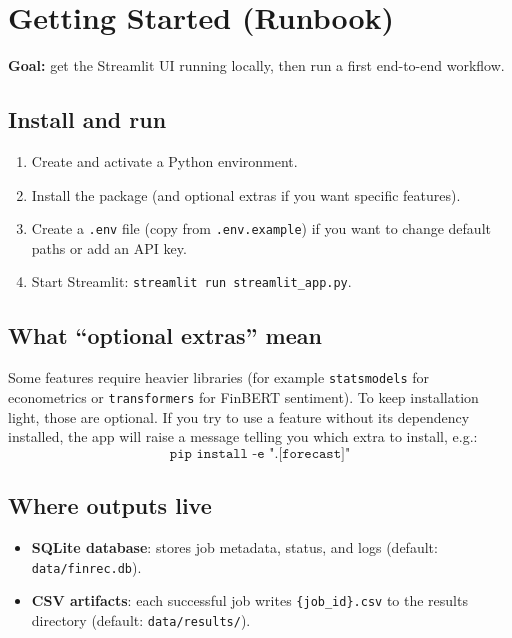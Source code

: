 \documentclass[11pt,a4paper]{article}
\begin{document}
\section{Getting Started (Runbook)}

\textbf{Goal:} get the Streamlit UI running locally, then run a first end-to-end workflow.

\subsection{Install and run}
\begin{enumerate}[leftmargin=2.2em]
  \item Create and activate a Python environment.
  \item Install the package (and optional extras if you want specific features).
  \item Create a \texttt{.env} file (copy from \texttt{.env.example}) if you want to change default paths or add an API key.
  \item Start Streamlit: \texttt{streamlit run streamlit\_app.py}.
\end{enumerate}

\subsection{What ``optional extras'' mean}
Some features require heavier libraries (for example \texttt{statsmodels} for econometrics or \texttt{transformers} for FinBERT sentiment). To keep installation light, those are optional. If you try to use a feature without its dependency installed, the app will raise a message telling you which extra to install, e.g.:
\[
\texttt{pip install -e ".[forecast]"}
\]

\subsection{Where outputs live}
\begin{itemize}[leftmargin=2em]
  \item \textbf{SQLite database}: stores job metadata, status, and logs (default: \texttt{data/finrec.db}).
  \item \textbf{CSV artifacts}: each successful job writes \texttt{\{job\_id\}.csv} to the results directory (default: \texttt{data/results/}).
\end{itemize}
\end{document}
